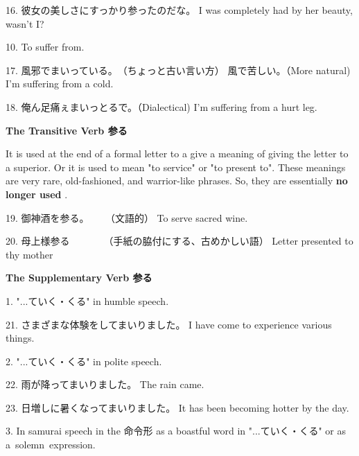 \par{16. 彼女の美しさにすっかり参ったのだな。 \hfill\break
I was completely had by her beauty, wasn't I? \hfill\break
}

\par{10. To suffer from. }

\par{17. 風邪でまいっている。　（ちょっと古い言い方） \hfill\break
風で苦しい。（More natural) \hfill\break
I'm suffering from a cold. \hfill\break
}

\par{18. 俺ん足痛ぇまいっとるで。（Dialectical) \hfill\break
I'm suffering from a hurt leg. \hfill\break
}

\par{\textbf{The Transitive Verb 参る }\hfill\break
}

\par{It is used at the end of a formal letter to a give a meaning of giving the letter to a superior. Or it is used to mean "to service" or "to present to". These meanings are very rare, old-fashioned, and warrior-like phrases. So, they are essentially \textbf{no longer used }. }

\par{19. 御神酒を参る。    （文語的） \hfill\break
To serve sacred wine. }

\par{20. 母上様参る　　　　（手紙の脇付にする、古めかしい語） \hfill\break
Letter presented to thy mother \hfill\break
}

\par{\textbf{The Supplementary Verb 参る }}

\par{1. "\dothyp{}\dothyp{}\dothyp{}ていく・くる" in humble speech. }

\par{21. さまざまな体験をしてまいりました。 \hfill\break
I have come to experience various things. \hfill\break
}

\par{2. "\dothyp{}\dothyp{}\dothyp{}ていく・くる" in polite speech. }

\par{22. 雨が降ってまいりました。 \hfill\break
The rain came. }

\par{23. 日増しに暑くなってまいりました。 \hfill\break
It has been becoming hotter by the day. \hfill\break
}

\par{3. In samurai speech in the 命令形 as a boastful word in "\dothyp{}\dothyp{}\dothyp{}ていく・くる" or as a solemn expression. }

